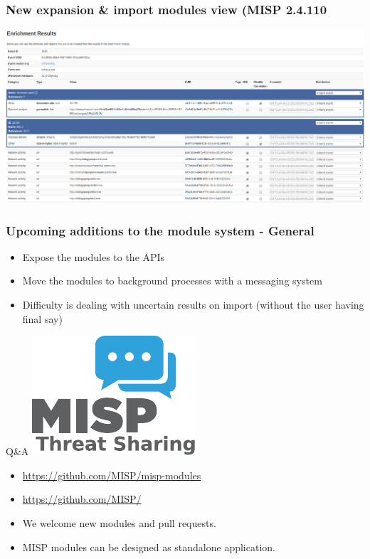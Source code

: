 \begin{frame}[fragile]
        \frametitle{New expansion \& import modules view (MISP 2.4.110}
    \includegraphics[scale=0.2]{new_format_view.png}
\end{frame}

\begin{frame}[fragile]
    \frametitle{Upcoming additions to the module system - General}
    \begin{itemize}
        \item Expose the modules to the APIs
        \item Move the modules to background processes with a messaging system
        \item Difficulty is dealing with uncertain results on import (without the user having final say)
    \end{itemize}
\end{frame}

\begin{frame}[t,fragile] {Q\&A}
\includegraphics[scale=0.5]{misplogo.pdf}
\begin{itemize}
        \item \url{https://github.com/MISP/misp-modules}
        \item \url{https://github.com/MISP/}
        \item We welcome new modules and pull requests.
        \item MISP modules can be designed as standalone application.
\end{itemize}

\end{frame}

